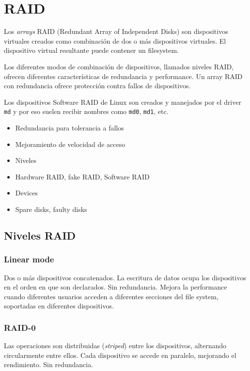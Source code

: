 \section{RAID}

Los \emph{arrays} RAID (Redundant Array of Independent Disks) son dispositivos virtuales creados como combinación de dos o más dispositivos virtuales. El dispositivo virtual resultante puede contener un filesystem. 

Los diferentes modos de combinación de dispositivos, llamados niveles RAID, ofrecen diferentes características de redundancia y performance. Un array RAID con redundancia ofrece protección contra fallos de dispositivos. 

Los dispositivos Software RAID de Linux son creados y manejados por el driver \lstinline{md} y por eso suelen recibir nombres como \lstinline{md0}, \lstinline{md1}, etc.

 
\begin{itemize}
	\item Redundancia para tolerancia a fallos
	\item Mejoramiento de velocidad de acceso
	\item Niveles 
	\item Hardware RAID, fake RAID, Software RAID
	\item Devices
	\item Spare disks, faulty disks
\end{itemize}



\subsection {Niveles RAID}
\subsubsection{Linear mode}
Dos o más dispositivos concatenados. La escritura de datos ocupa los dispositivos en el orden en que son declarados. 
Sin redundancia.
Mejora la performance cuando diferentes usuarios acceden a diferentes secciones del file system, soportadas en diferentes dispositivos.


\subsubsection{RAID-0}
\label{ssub:RAID-0}
Las operaciones son distribuidas (\emph{striped}) entre los dispositivos, alternando circularmente entre ellos. Cada dispositivo se accede en paralelo, mejorando el rendimiento. Sin redundancia. 


